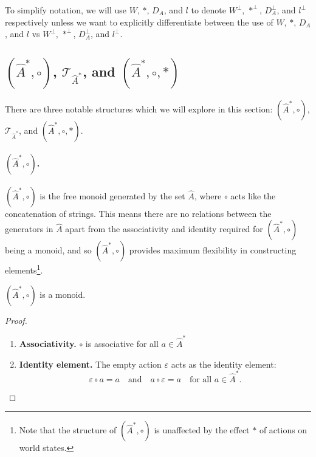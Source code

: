 To simplify notation, we will use $W$, $\ast$, $D_{A}$, and $l$ to denote $W^{\bot}$, $\ast^{\bot}$, $D_{A}^{\bot}$, and $l^{\bot}$ respectively unless we want to explicitly differentiate between the use of $W$, $\ast$, $D_{A}$, and $l$ vs $W^{\bot}$, $\ast^{\bot}$, $D_{A}^{\bot}$, and $l^{\bot}$.


\subsection{$(\hat{A}^{\ast}, \circ)$, $\mathcal{T}_{\hat{A}^{\ast}}$, and $(\hat{A}^{\ast}, \circ, \ast)$}

There are three notable structures which we will explore in this section: $(\hat{A}^{\ast}, \circ)$, $\mathcal{T}_{\hat{A}^{\ast}}$, and $(\hat{A}^{\ast}, \circ, \ast)$.

\paragraph{$(\hat{A}^{\ast}, \circ)$.}
$(\hat{A}^{\ast}, \circ)$ is the free monoid generated by the set $\hat{A}$, where $\circ$ acts like the concatenation of strings.
This means there are no relations between the generators in $\hat{A}$ apart from the associativity and identity required for $(\hat{A}^{\ast}, \circ)$ being a monoid, and so $(\hat{A}^{\ast}, \circ)$ provides maximum flexibility in constructing elements\footnote{Note that the structure of $(\hat{A}^{\ast}, \circ)$ is unaffected by the effect $\ast$ of actions on world states.}.

\begin{proposition}
	$(\hat{A}^{\ast}, \circ)$ is a monoid.
\end{proposition}
\begin{proof}
	\begin{enumerate}
		\item \textbf{Associativity.}
		      $\circ$ is associative for all $a \in \hat{A}^{\ast}$
		\item \textbf{Identity element.}
		      The empty action $\varepsilon$ acts as the identity element:
		      \begin{equation}
			      \varepsilon \circ a = a \quad \text{and} \quad a \circ \varepsilon = a \quad \text{for all } a \in \hat{A}^{\ast}.
		      \end{equation}
	\end{enumerate}
\end{proof}

